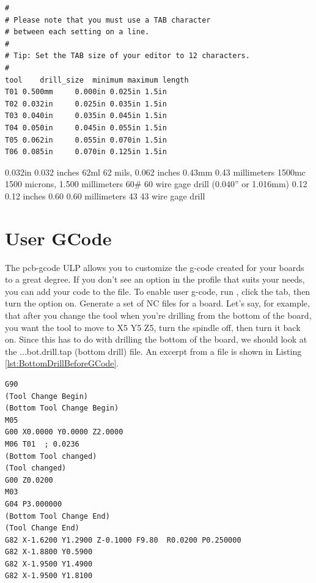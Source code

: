 \documentclass[11pt]{book}
\begin{document}
\begin{lstlisting}[caption={Sample Rack File},label={lst:SampleRackFile}]
#
# Please note that you must use a TAB character
# between each setting on a line.
# 
# Tip: Set the TAB size of your editor to 12 characters.
#
tool	drill_size	minimum	maximum	length
T01	0.500mm		0.000in	0.025in	1.5in
T02	0.032in		0.025in	0.035in	1.5in
T03	0.040in		0.035in	0.045in	1.5in
T04	0.050in		0.045in	0.055in	1.5in
T05	0.062in		0.055in	0.070in	1.5in
T06	0.085in		0.070in	0.125in	1.5in
\end{lstlisting}

\begin{nbcode}[caption={Sample entries for rack files},label={lst:SampleEntries}]
0.032in   0.032 inches
62ml      62 mils, 0.062 inches
0.43mm    0.43 millimeters
1500mc    1500 microns, 1.500 millimeters
60#       60 wire gage drill (0.040'' or 1.016mm)
0.12      0.12 inches
0.60      0.60 millimeters
43        43 wire gage drill
\end{nbcode}



%
%
\section{User GCode}\label{sec:UserGCode}

The pcb-gcode ULP allows you to customize the g-code created for your boards to a great degree. If you don't see an option in the profile that suits your needs, you can add your code to the  file. To enable user g-code, run , click the  tab, then turn the  option on. Generate a set of NC files for a board. Let's say, for example, that after you change the tool when you're drilling from the bottom of the board, you want the tool to move to X5 Y5 Z5, turn the spindle off, then turn it back on. Since this has to do with drilling the bottom of the board, we should look at the ...bot.drill.tap (bottom drill) file. An excerpt from a file is shown in Listing \vref{lst:BottomDrillBeforeGCode}.

\begin{lstlisting}[caption={Bottom drill file before adding user g-code.},label={lst:BottomDrillBeforeGCode}]
G90
(Tool Change Begin)
(Bottom Tool Change Begin)
M05
G00 X0.0000 Y0.0000 Z2.0000
M06 T01  ; 0.0236
(Bottom Tool changed)
(Tool changed)
G00 Z0.0200
M03
G04 P3.000000
(Bottom Tool Change End)
(Tool Change End)
G82 X-1.6200 Y1.2900 Z-0.1000 F9.80  R0.0200 P0.250000
G82 X-1.8800 Y0.5900
G82 X-1.9500 Y1.4900
G82 X-1.9500 Y1.8100
\end{lstlisting}
\end{document}
